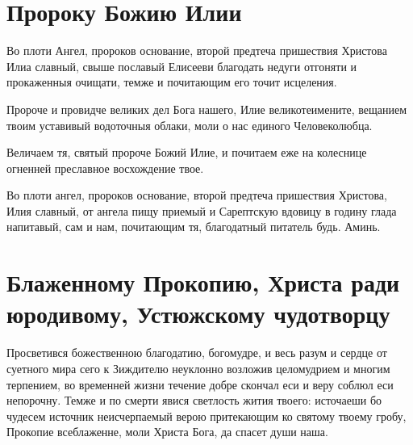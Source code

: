 
 

\section{Пророку Божию Илии}
 



Во плоти Ангел, пророков основание, второй предтеча пришествия Христова Илиа славный, свыше пославый Елисееви благодать недуги отгоняти и прокаженныя очищати, темже и почитающим его точит исцеления.




Пророче и провидче великих дел Бога нашего, Илие великотеимените, вещанием твоим уставивый водоточныя облаки, моли о нас единого Человеколюбца.




Величаем тя, святый пророче Божий Илие, и почитаем еже на колеснице огненней преславное восхождение твое.




Во плоти ангел, пророков основание, второй предтеча пришествия Христова, Илия славный, от ангела пищу приемый и Сарептскую вдовицу в годину глада напитавый, сам и нам, почитающим тя, благодатный питатель будь. Аминь.


\section{Блаженному Прокопию, Христа ради юродивому, Устюжскому  чудотворцу}
 




Просветився божественною благодатию, богомудре, и весь разум и сердце от суетного мира сего к Зиждителю неуклонно возложив целомудрием и многим терпением, во временней жизни течение добре скончал еси и веру соблюл еси непорочну. Темже и по смерти явися светлость жития твоего: источаеши бо чудесем источник неисчерпаемый верою притекающим ко святому твоему гробу, Прокопие всеблаженне, моли Христа Бога, да спасет души наша.





